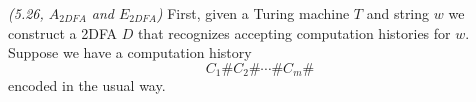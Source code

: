 \begin{problem}{\it(5.26, $A_{2DFA}$ and $E_{2DFA}$)}
First, given a Turing machine $T$ and string $w$ we construct a 2DFA $D$ that recognizes accepting computation histories for $w$. %
Suppose we have a computation history
\[
C_1\#C_2\#\cdots \#C_m\#
\]
encoded in the usual way. 
%

\end{problem}
